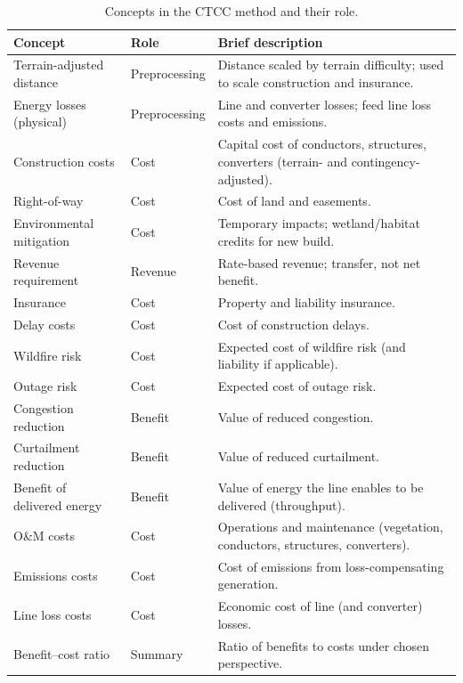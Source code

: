 \documentclass[ctcc_full_documentation.tex]{subfiles}
\begin{document}
\begin{table}[htbp]
\centering
\small
\begin{tabular}{@{}llp{5.5cm}@{}}
\toprule
\textbf{Concept} & \textbf{Role} & \textbf{Brief description} \\
\midrule
Terrain-adjusted distance & Preprocessing & Distance scaled by terrain difficulty; used to scale construction and insurance. \\
Energy losses (physical) & Preprocessing & Line and converter losses; feed line loss costs and emissions. \\
Construction costs & Cost & Capital cost of conductors, structures, converters (terrain- and contingency-adjusted). \\
Right-of-way & Cost & Cost of land and easements. \\
Environmental mitigation & Cost & Temporary impacts; wetland/habitat credits for new build. \\
Revenue requirement & Revenue & Rate-based revenue; transfer, not net benefit. \\
Insurance & Cost & Property and liability insurance. \\
Delay costs & Cost & Cost of construction delays. \\
Wildfire risk & Cost & Expected cost of wildfire risk (and liability if applicable). \\
Outage risk & Cost & Expected cost of outage risk. \\
Congestion reduction & Benefit & Value of reduced congestion. \\
Curtailment reduction & Benefit & Value of reduced curtailment. \\
Benefit of delivered energy & Benefit & Value of energy the line enables to be delivered (throughput). \\
O\&M costs & Cost & Operations and maintenance (vegetation, conductors, structures, converters). \\
Emissions costs & Cost & Cost of emissions from loss-compensating generation. \\
Line loss costs & Cost & Economic cost of line (and converter) losses. \\
Benefit--cost ratio & Summary & Ratio of benefits to costs under chosen perspective. \\
\bottomrule
\end{tabular}
\caption{Concepts in the CTCC method and their role.}
\label{tab:methodology-concepts}
\end{table}
\end{document}

